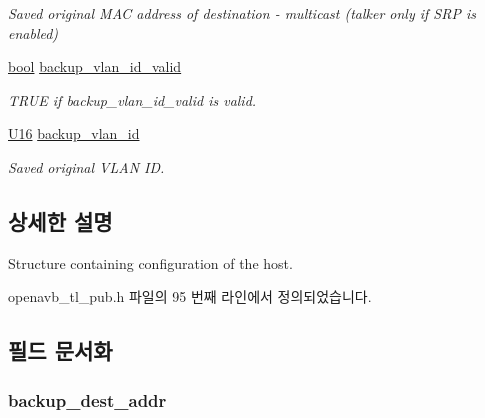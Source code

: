 \begin{DoxyCompactItemize}
\begin{DoxyCompactList}\small\item\em Saved original M\+AC address of destination -\/ multicast (talker only if S\+RP is enabled) \end{DoxyCompactList}\item 
\hyperlink{avb__gptp_8h_af6a258d8f3ee5206d682d799316314b1}{bool} \hyperlink{structopenavb__tl__cfg__t_af6370c811960994878315500dbdf5724}{backup\+\_\+vlan\+\_\+id\+\_\+valid}
\begin{DoxyCompactList}\small\item\em T\+R\+UE if backup\+\_\+vlan\+\_\+id\+\_\+valid is valid. \end{DoxyCompactList}\item 
\hyperlink{openavb__types__base__pub_8h_a0a0a322d5fa4a546d293a77ba8b4a71f}{U16} \hyperlink{structopenavb__tl__cfg__t_adc2b5db884c2baf180058e1a60dd3614}{backup\+\_\+vlan\+\_\+id}
\begin{DoxyCompactList}\small\item\em Saved original V\+L\+AN ID. \end{DoxyCompactList}\end{DoxyCompactItemize}


\subsection{상세한 설명}
Structure containing configuration of the host. 

openavb\+\_\+tl\+\_\+pub.\+h 파일의 95 번째 라인에서 정의되었습니다.



\subsection{필드 문서화}
\subsubsection[{\texorpdfstring{backup\+\_\+dest\+\_\+addr}{backup_dest_addr}}]{ backup\+\_\+dest\+\_\+addr}\hypertarget{structopenavb__tl__cfg__t_a2a40b6c0030df9a47d98c104cbc6e212}{}\label{structopenavb__tl__cfg__t_a2a40b6c0030df9a47d98c104cbc6e212}


